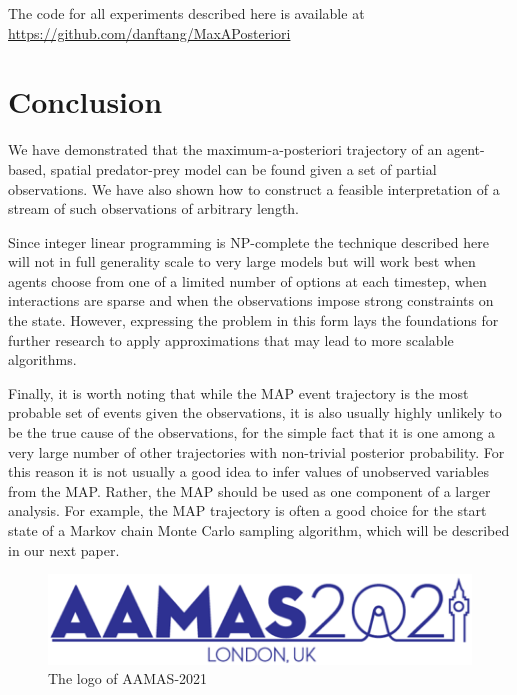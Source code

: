 \documentclass[sigconf]{aamas}
\begin{document}
The code for all experiments described here is available at \href{https://github.com/danftang/MaxAPosteriori}{https://github.com/danftang/MaxAPosteriori}

\section{Conclusion}

We have demonstrated that the maximum-a-posteriori trajectory of an agent-based, spatial predator-prey model can be found given a set of partial observations. We have also shown how to construct a feasible interpretation of a stream of such observations of arbitrary length.

Since integer linear programming is NP-complete the technique described here will not in full generality scale to very large models but will work best when agents choose from one of a limited number of options at each timestep, when interactions are sparse and when the observations impose strong constraints on the state. However, expressing the problem in this form lays the foundations for further research to apply approximations that may lead to more scalable algorithms.

Finally, it is worth noting that while the MAP event trajectory is the most probable set of events given the observations, it is also usually highly unlikely to be the true cause of the observations, for the simple fact that it is one among a very large number of other trajectories with non-trivial posterior probability. For this reason it is not usually a good idea to infer values of unobserved variables from the MAP. Rather, the MAP should be used as one component of a larger analysis. For example, the MAP trajectory is often a good choice for the start state of a Markov chain Monte Carlo sampling algorithm, which will be described in our next paper.






\begin{figure}[h]
  \centering
  \includegraphics[width=\linewidth]{aamas21logo}
  \caption{The logo of AAMAS-2021}
  \label{fig:logo}
\end{figure}
\end{document}
